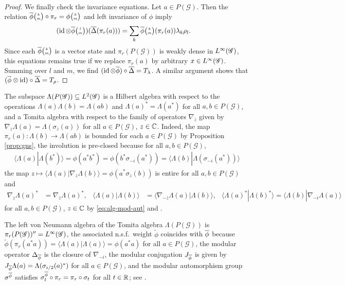 \begin{proof}
We finally check the invariance equations.  Let $a \in
P(\mathscr{G})$.  Then the relation $\overline{\phi}{\tiny {\begin{pmatrix} k\\m\end{pmatrix}}}\circ \pi_{r} = \phi{\tiny {\begin{pmatrix} k\\m\end{pmatrix}}}$
and left invariance of $\phi$ imply
  \begin{align*}
    (\operatorname{id} \otimes \overline{\phi}{\tiny {\begin{pmatrix} l\\m\end{pmatrix}}})(\overline{\Delta}(\pi_{r}(a))) &= \sum_{k}
    \overline{\phi}{\tiny {\begin{pmatrix} k\\m\end{pmatrix}}}(\pi_{r}(a)) \lambda_{k}\rho_{l}.
  \end{align*}
  Since each $\overline{\phi}{\tiny {\begin{pmatrix} k\\m\end{pmatrix}}}$ is a vector state and $\pi_{r}(P(\mathscr{G}))$ is
  weakly dense in $L^{\infty}(\mathscr{G})$,  this equations
  remains true if we replace $\pi_{r}(a)$ by arbitrary $x\in
  L^{\infty}(\mathscr{G})$. Summing over $l$ and $m$, we  find $(\operatorname{id} \otimes \overline{\phi})
  \circ \overline{\Delta} = T_{\lambda}$. A similar argument shows that
  $(\overline{\phi} \otimes \operatorname{id}) \circ \overline{\Delta}=T_{\rho}$.
\end{proof}

\begin{Rem}
  \label{remark:vn-hilbert} The subspace $\Lambda(P(\mathscr{G}))
  \subseteq L^{2}(\mathscr{G})$ is a Hilbert algebra with respect to the
  operations $\Lambda(a)\Lambda(b)=\Lambda(ab)$ and $\Lambda(a)^{*}=
  \Lambda(a^{*})$ for all $a,b\in P(\mathscr{G})$, and a Tomita
  algebra with respect to the family of operators $\nabla_{z}$ given
  by $\nabla_{z}\Lambda(a)=\Lambda(\sigma_{z}(a))$ for all $a\in
  P(\mathscr{G})$, $z\in \mathbb{C}$. Indeed, the map $\pi_{r}(a)\colon
  \Lambda(b) \to \Lambda(ab)$ is bounded for each $a \in
  P(\mathscr{G})$ by Proposition \ref{prop:gns}, the involution is
  pre-closed because for all $a,b \in P(\mathscr{G})$,
  \begin{align*}
    \langle \Lambda(a)|\Lambda(b^{*})\rangle = \phi(a^{*}b^{*}) =
    \phi(b^{*}\sigma_{-i}(a^{*})) = \langle
    \Lambda(b)|\Lambda(\sigma_{-i}(a^{*}))\rangle
  \end{align*}
  the map $z\mapsto \langle \Lambda(a)|\nabla_{z}\Lambda(b)\rangle =
  \phi(a^{*}\sigma_{z}(b))$ is entire for all $a,b\in P(\mathscr{G})$
  and 
  \begin{align*}
    \nabla_{z}\Lambda(a)^{*} &= \nabla_{\overline{z}}\Lambda(a)^{*}, &
    \langle \Lambda(a)|\Lambda(b)\rangle &= \langle
    \nabla_{-\overline{z}}\Lambda(a) |\Lambda(b)\rangle, & \langle
    \Lambda(a)^{*}|\Lambda(b)^{*}\rangle = \langle \Lambda(b)|\nabla_{-i}\Lambda(a)\rangle
  \end{align*}
  for all $a,b\in P(\mathscr{G})$, $z\in \mathbb{C}$ by \eqref{eq:alg-mod-aut} and 
 \cite[Theorem 3.49]{DCT1}.

 The left von Neumann algebra of the Tomita algebra
 $\Lambda(P(\mathscr{G}))$ is $\pi_{r}(P(\mathscr{G}))''=L^{\infty}(\mathscr{G})$, the
 associated n.s.f.\ weight $\tilde\phi$ coincides with $\overline{\phi}$ because
 $\tilde \phi(\pi_{r}(a^{*}a))=\langle\Lambda(a)|\Lambda(a)\rangle =
 \phi(a^{*}a)$ for all $a\in P(\mathscr{G})$,  the modular
 operator $\Delta_{\overline{\phi}}$ is the closure of $\nabla_{-i}$, the
 modular conjugation $J_{\overline{\phi}}$ is given by
 $J_{\overline{\phi}}\Lambda(a)=\Lambda(\sigma_{i/2}(a)^{*})$ for all $a\in
 P(\mathscr{G})$, and the modular automorphism group $\sigma^{\overline{\phi}}$
 satisfies $\sigma^{\overline{\phi}}_{t} \circ \pi_{r} = \pi_{r} \circ
 \sigma_{t}$ for all $t\in \mathbb{R}$; see
  \cite[Theorem VI.2.2 and its proof]{Taksak2}.
\end{Rem}


